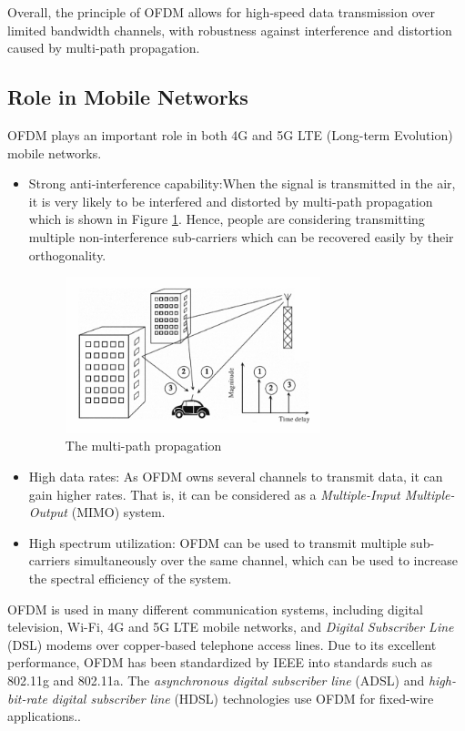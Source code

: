 \documentclass[11pt]{article}
\numberwithin{figure}{section}
\numberwithin{equation}{section}
\begin{document}
Overall, the principle of OFDM allows for high-speed data transmission over limited bandwidth channels, with robustness against interference and distortion caused by multi-path propagation. 
\subsection{Role in Mobile Networks}
OFDM plays an important role in both 4G and 5G LTE (Long-term Evolution) mobile networks.
\begin{itemize}
    \item Strong anti-interference capability:When the signal is transmitted in the air, it is very likely to be interfered and distorted by multi-path propagation which is shown in Figure \ref{fig:multipath propagation}. Hence, people are considering transmitting multiple non-interference sub-carriers which can be recovered easily by their orthogonality.
    \begin{figure}[!ht]
        \centering
        \includegraphics[width=0.7\textwidth]{images/multipath propagation.png}
        \caption{\label{fig:multipath propagation}The multi-path propagation}
    \end{figure}
    \item High data rates: As OFDM owns several channels to transmit data, it can gain higher rates. That is, it can be considered as a \textit{Multiple-Input Multiple-Output} (MIMO) system.
    \item High spectrum utilization: OFDM can be used to transmit multiple sub-carriers simultaneously over the same channel, which can be used to increase the spectral efficiency of the system.
\end{itemize}

OFDM is used in many different communication systems, including digital television, Wi-Fi, 4G and 5G LTE  mobile networks, and \textit{Digital Subscriber Line} (DSL) modems over copper-based telephone access lines. Due to its excellent performance, OFDM has been standardized by IEEE into standards such as 802.11g and 802.11a. The \textit{asynchronous digital subscriber line} (ADSL) and \textit{high-bit-rate digital subscriber line} (HDSL) technologies use OFDM for fixed-wire applications.\cite{RN78, RN79}.
\end{document}
